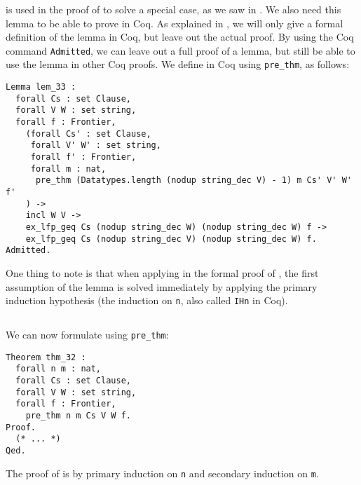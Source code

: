  is used in the proof of  to solve
a special case, as we saw in .
We also need this lemma to be able to prove  in Coq.
As explained in ,
we will only give a formal definition of the lemma in Coq,
but leave out the actual proof. By using the Coq command \lstinline{Admitted},
we can leave out a full proof of a lemma, but still be able to use the lemma in other Coq proofs.
We define  in Coq using \lstinline{pre_thm}, as follows:

\begin{minipage}{\linewidth}
\begin{lstlisting}[language=Coq, label={lst:lem_33}, caption={\Cref{lem:3.3} in Coq}]
Lemma lem_33 :
  forall Cs : set Clause,
  forall V W : set string,
  forall f : Frontier,
    (forall Cs' : set Clause,
     forall V' W' : set string,
     forall f' : Frontier,
     forall m : nat,
      pre_thm (Datatypes.length (nodup string_dec V) - 1) m Cs' V' W' f'
    ) ->
    incl W V ->
    ex_lfp_geq Cs (nodup string_dec W) (nodup string_dec W) f ->
    ex_lfp_geq Cs (nodup string_dec V) (nodup string_dec W) f.
Admitted.
\end{lstlisting}
\end{minipage}

One thing to note is that when applying  in the formal proof of ,
the first assumption of the lemma is solved immediately by applying the primary induction hypothesis
(the induction on \lstinline{n}, also called \lstinline{IHn} in Coq).

\subsection{}

We can now formulate  using \lstinline{pre_thm}:

\begin{minipage}{\linewidth}
\begin{lstlisting}[language=Coq, label={lst:thm_32}, caption={\Cref{thm:3.2} in Coq}]
Theorem thm_32 :
  forall n m : nat,
  forall Cs : set Clause,
  forall V W : set string,
  forall f : Frontier,
    pre_thm n m Cs V W f.
Proof.
  (* ... *)
Qed.
\end{lstlisting}
\end{minipage}

The proof of  is by primary induction on \lstinline{n} and secondary induction on \lstinline{m}.

